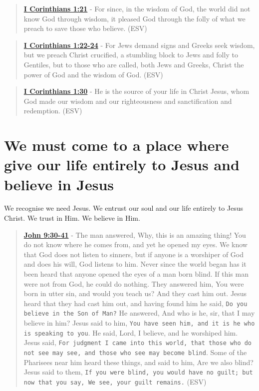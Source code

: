 \documentclass[11pt]{article}
\begin{document}
\begin{quote}
\textbf{\href{https://www.biblegateway.com/passage/?search=1\%20Corinthians\%201\%3A21\&version=ESV}{I Corinthians 1:21}} - For since, in the wisdom of God, the world did not know God through wisdom, it pleased God through the folly of what we preach to save those who believe. (ESV)
\end{quote}

\begin{quote}
\textbf{\href{https://www.biblegateway.com/passage/?search=1\%20Corinthians\%201\%3A22-24\&version=ESV}{I Corinthians 1:22-24}} - For Jews demand signs and Greeks seek wisdom, but we preach Christ crucified, a stumbling block to Jews and folly to Gentiles, but to those who are called, both Jews and Greeks, Christ the power of God and the wisdom of God. (ESV)
\end{quote}

\begin{quote}
\textbf{\href{https://www.biblegateway.com/passage/?search=1\%20Corinthians\%201\%3A30\&version=ESV}{I Corinthians 1:30}} - He is the source of your life in Christ Jesus, whom God made our wisdom and our righteousness and sanctification and redemption. (ESV)
\end{quote}

\section{We must come to a place where give our life entirely to Jesus and believe in Jesus}
\label{sec:org931e38a}
We recognise we need Jesus.
We entrust our soul and our life entirely to Jesus Christ.
We trust in Him. We believe in Him.

\begin{quote}
\textbf{\href{https://www.biblegateway.com/passage/?search=John\%209\%3A30-41\&version=ESV}{John 9:30-41}} - The man answered, Why, this is an amazing thing! You do not know where he comes from, and yet he opened my eyes. We know that God does not listen to sinners, but if anyone is a worshiper of God and does his will, God listens to him. Never since the world began has it been heard that anyone opened the eyes of a man born blind. If this man were not from God, he could do nothing. They answered him, You were born in utter sin, and would you teach us? And they cast him out. Jesus heard that they had cast him out, and having found him he said, \texttt{Do you believe in the Son of Man?} He answered, And who is he, sir, that I may believe in him? Jesus said to him, \texttt{You have seen him, and it is he who is speaking to you}. He said, Lord, I believe, and he worshiped him. Jesus said, \texttt{For judgment I came into this world, that those who do not see may see, and those who see may become blind}. Some of the Pharisees near him heard these things, and said to him, Are we also blind? Jesus said to them, \texttt{If you were blind, you would have no guilt; but now that you say, We see, your guilt remains.} (ESV)
\end{quote}
\end{document}
